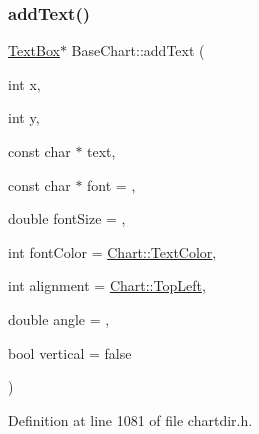 \subsubsection{\texorpdfstring{add\+Text()}{addText()}}
{\footnotesize\ttfamily \hyperlink{class_text_box}{Text\+Box}$\ast$ Base\+Chart\+::add\+Text (\begin{DoxyParamCaption}\item[{int}]{x,  }\item[{int}]{y,  }\item[{const char $\ast$}]{text,  }\item[{const char $\ast$}]{font = {},  }\item[{double}]{font\+Size = {},  }\item[{int}]{font\+Color = {\ttfamily \hyperlink{namespace_chart_abee0d882fdc9ad0b001245ad9fc64011a879e14f2f5024caccc047374342321ef}{Chart\+::\+Text\+Color}},  }\item[{int}]{alignment = {\ttfamily \hyperlink{namespace_chart_ae222e51ce11a254450b6ddfbc862680aa0bf92d1d2d6713aa62e92b86b9a8532f}{Chart\+::\+Top\+Left}},  }\item[{double}]{angle = {},  }\item[{bool}]{vertical = {\ttfamily false} }\end{DoxyParamCaption})\hspace{0.3cm}{\ttfamily [inline]}}



Definition at line 1081 of file chartdir.\+h.

